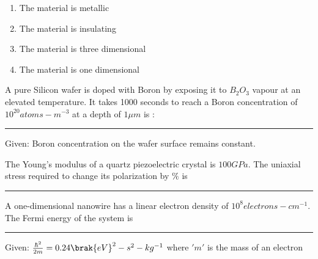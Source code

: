 		\begin{figure}[H]
			\centering
		\end{figure}

		\hfill{}

		\begin{enumerate}
			\item The material is metallic
			\item The material is insulating
			\item The material is three dimensional
			\item The material is one dimensional
		\end{enumerate}

	\item A pure Silicon wafer is doped with Boron by exposing it to $B_2O_3$ vapour at an elevated temperature. It takes 1000 seconds to reach a Boron concentration of $10^{20} atoms-m^{-3}$ at a depth of $1\mu m$ is :\rule{1cm}{0.1pt} 

		Given: Boron concentration on the wafer surface remains constant.

		\hfill{}

	\item The Young's modulus of a quartz piezoelectric crystal is $100GPa$. The uniaxial stress required to change its polarization by $\%$ is \rule{1cm}{0.1pt}  

		\hfill{}

	\item A one-dimensional nanowire has a linear electron density of $10^8 electrons-cm^{-1}$. The Fermi energy of the system is \rule{1cm}{0.1pt} 

		Given: $\frac{\hbar^2}{2m} = 0.24\brak{eV}^2-s^2-kg^{-1}$ where $'m'$ is the mass of an electron


